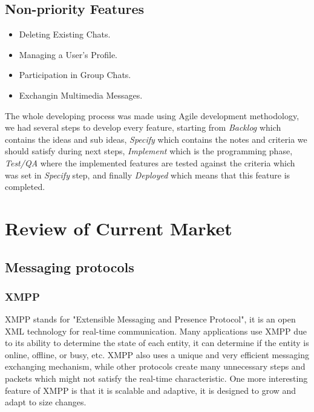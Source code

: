 \documentclass[11pt,a4paper]{report}
\begin{document}
\section{Non-priority Features}
	\begin{itemize}
		\item Deleting Existing Chats.
		\item Managing a User's Profile.
		\item Participation in Group Chats.
		\item Exchangin Multimedia Messages.
	\end{itemize}

The whole developing process was made using Agile development methodology, we had several steps to develop every feature, starting from \emph{Backlog} which contains the ideas and sub ideas, \emph {Specify} which contains the notes and criteria we should satisfy during next steps, \emph{Implement} which is the programming phase, \emph{Test/QA} where the implemented features are tested against the criteria which was set in \emph{Specify} step, and finally \emph{Deployed} which means that this feature is completed.



\chapter{Review of Current Market}


\section{Messaging protocols}

\subsection{XMPP}
XMPP stands for "Extensible Messaging and Presence Protocol", it is an open XML technology for real-time communication. Many applications use XMPP due to its ability to determine the state of each entity, it can determine if the entity is online, offline, or busy, etc. XMPP also uses a unique and very efficient messaging exchanging mechanism, while other protocols create many unnecessary steps and packets which might not satisfy the real-time characteristic. One more interesting feature of XMPP is that it is scalable and adaptive, it is designed to grow and adapt to size changes.
\end{document}
